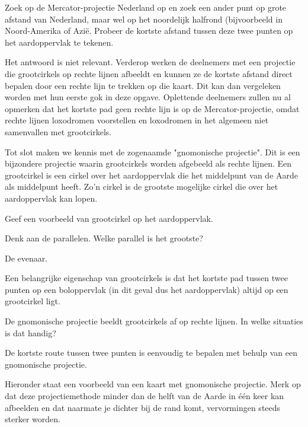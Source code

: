 \begin{opgave}
	Zoek op de Mercator-projectie Nederland op en zoek een ander punt op grote afstand van Nederland, maar wel op het noordelijk halfrond (bijvoorbeeld in Noord-Amerika of Azi\"e. Probeer de kortste afstand tussen deze twee punten op het aardoppervlak te tekenen.
	\begin{antwoord}
		Het antwoord is niet relevant. Verderop werken de deelnemers met een projectie die grootcirkels op rechte lijnen afbeeldt en kunnen ze de kortste afstand direct bepalen door een rechte lijn te trekken op die kaart. Dit kan dan vergeleken worden met hun eerste gok in deze opgave. Oplettende deelnemers zullen nu al opmerken dat het kortste pad geen rechte lijn is op de Mercator-projectie, omdat rechte lijnen loxodromen voorstellen en loxodromen in het algemeen niet samenvallen met grootcirkels.
	\end{antwoord}
\end{opgave}

Tot slot maken we kennis met de zogenaamde "gnomonische projectie". Dit is een bijzondere projectie waarin grootcirkels worden afgebeeld als rechte lijnen. Een grootcirkel is een cirkel over het aardoppervlak die het middelpunt van de Aarde als middelpunt heeft. Zo'n cirkel is de grootste mogelijke cirkel die over het aardoppervlak kan lopen.

\begin{opgave}
	Geef een voorbeeld van grootcirkel op het aardoppervlak.
	\begin{hint}
		Denk aan de parallelen. Welke parallel is het grootste?
	\end{hint}
	\begin{antwoord}
		De evenaar.
	\end{antwoord}
\end{opgave}

Een belangrijke eigenschap van grootcirkels is dat het kortste pad tussen twee punten op een boloppervlak (in dit geval dus het aardoppervlak) altijd op een grootcirkel ligt.

\begin{opgave}
	De gnomonische projectie beeldt grootcirkels af op rechte lijnen. In welke situaties is dat handig?
	\begin{antwoord}
		De kortste route tussen twee punten is eenvoudig te bepalen met behulp van een gnomonische projectie.
	\end{antwoord}
\end{opgave}

Hieronder staat een voorbeeld van een kaart met gnomonische projectie. Merk op dat deze projectiemethode minder dan de helft van de Aarde in \'e\'en keer kan afbeelden en dat naarmate je dichter bij de rand komt, vervormingen steeds sterker worden.

